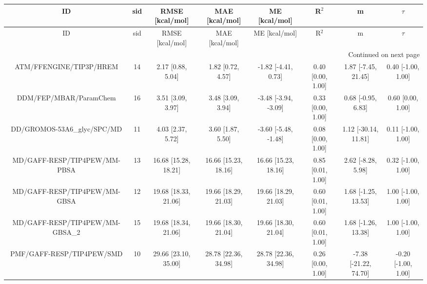 \documentclass[8pt]{article}
\begin{document}
\begin{center}
\begin{footnotesize}
\begin{longtable}{|cccccccc|}
\toprule
                             ID & sid &      RMSE [kcal/mol] &       MAE [kcal/mol] &        ME [kcal/mol] &             R$^2$ &                     m &              $\tau$ \\
\midrule
\endfirsthead

\toprule
                             ID & sid &      RMSE [kcal/mol] &       MAE [kcal/mol] &        ME [kcal/mol] &             R$^2$ &                     m &              $\tau$ \\
\midrule
\endhead
\midrule
\multicolumn{8}{r}{{Continued on next page}} \\
\midrule
\endfoot

\bottomrule
\endlastfoot
        ATM/FFENGINE/TIP3P/HREM &  14 &    2.17 [0.88, 5.04] &    1.82 [0.72, 4.57] &  -1.82 [-4.41, 0.73] & 0.40 [0.00, 1.00] &   1.87 [-7.45, 21.45] &  0.40 [-1.00, 1.00] \\
         DDM/FEP/MBAR/ParamChem &  16 &    3.51 [3.09, 3.97] &    3.48 [3.09, 3.94] & -3.48 [-3.94, -3.09] & 0.33 [0.00, 1.00] &    0.68 [-0.95, 6.83] &   0.60 [0.00, 1.00] \\
    DD/GROMOS-53A6\_glyc/SPC/MD &  11 &    4.03 [2.37, 5.72] &    3.60 [1.87, 5.50] & -3.60 [-5.48, -1.48] & 0.08 [0.00, 1.00] &  1.12 [-30.14, 11.81] &  0.11 [-1.00, 1.00] \\
   MD/GAFF-RESP/TIP4PEW/MM-PBSA &  13 & 16.68 [15.28, 18.21] & 16.66 [15.23, 18.16] & 16.66 [15.23, 18.16] & 0.85 [0.01, 1.00] &    2.62 [-8.28, 5.98] &  0.32 [-1.00, 1.00] \\
   MD/GAFF-RESP/TIP4PEW/MM-GBSA &  12 & 19.68 [18.33, 21.06] & 19.66 [18.29, 21.03] & 19.66 [18.29, 21.03] & 0.60 [0.01, 1.00] &   1.68 [-1.25, 13.53] &  1.00 [-1.00, 1.00] \\
MD/GAFF-RESP/TIP4PEW/MM-GBSA\_2 &  15 & 19.68 [18.34, 21.06] & 19.66 [18.30, 21.04] & 19.66 [18.30, 21.04] & 0.60 [0.01, 1.00] &   1.68 [-1.26, 13.38] &  1.00 [-1.00, 1.00] \\
      PMF/GAFF-RESP/TIP4PEW/SMD &  10 & 29.66 [23.10, 35.00] & 28.78 [22.36, 34.98] & 28.78 [22.36, 34.98] & 0.26 [0.00, 1.00] & -7.38 [-21.22, 74.70] & -0.20 [-1.00, 1.00] \\
\end{longtable}
\end{footnotesize}
\end{center}
\end{document}
